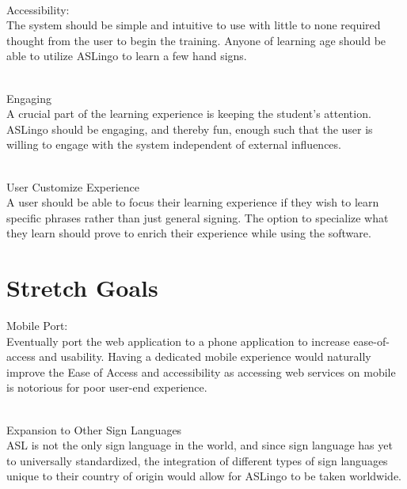 \documentclass{article}
\begin{document}
~\\Accessibility:\\
The system should be simple and intuitive to use with little to none required thought from the user to begin the training. Anyone of learning age should be able to utilize ASLingo to learn a few hand signs. 

~\\Engaging\\
A crucial part of the learning experience is keeping the student's attention. ASLingo should be engaging, and thereby fun, enough such that the user is willing to engage with the system independent of external influences.

~\\User Customize Experience\\
A user should be able to focus their learning experience if they wish to learn specific phrases rather than just general signing. The option to specialize what they learn should prove to enrich their experience while using the software.

\section{Stretch Goals}

Mobile Port:\\
Eventually port the web application to a phone application to increase ease-of-access and usability. Having a dedicated mobile experience would naturally improve the Ease of Access and accessibility as accessing web services on mobile is notorious for poor user-end experience.

~\\Expansion to Other Sign Languages\\
ASL is not the only sign language in the world, and since sign language has yet to universally standardized, the integration of different types of sign languages unique to their country of origin would allow for ASLingo to be taken worldwide.
\end{document}
